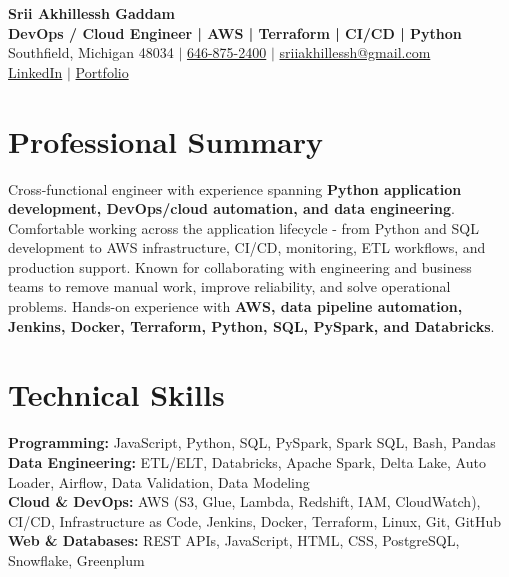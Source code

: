 \documentclass[letterpaper,10pt]{article}
\begin{document}
\fontsize{9.35pt}{10.45pt}\selectfont

\begin{center}
    {\LARGE \textbf{Srii Akhillessh Gaddam}} \\[-1pt]
    \textbf{DevOps / Cloud Engineer | AWS | Terraform | CI/CD | Python} \\[2pt]
    Southfield, Michigan 48034 $|$
    \href{tel:6468752400}{646-875-2400} $|$
    \href{mailto:sriiakhillessh@gmail.com}{sriiakhillessh@gmail.com} \\[1pt]
    \href{https://www.linkedin.com/in/srii-akhiilessh-gaddam-b48668191/}{LinkedIn} $|$
    \href{https://sriiakhillesshg.github.io/portfolio/}{Portfolio}
\end{center}
\vspace{-8pt}

\section{Professional Summary}
\small{Cross-functional engineer with experience spanning \textbf{Python application development, DevOps/cloud automation, and data engineering}. Comfortable working across the application lifecycle - from Python and SQL development to AWS infrastructure, CI/CD, monitoring, ETL workflows, and production support. Known for collaborating with engineering and business teams to remove manual work, improve reliability, and solve operational problems. Hands-on experience with \textbf{AWS, data pipeline automation, Jenkins, Docker, Terraform, Python, SQL, PySpark, and Databricks}.}

\section{Technical Skills}
\small{
\textbf{Programming:} JavaScript, Python, SQL, PySpark, Spark SQL, Bash, Pandas \\
\textbf{Data Engineering:} ETL/ELT, Databricks, Apache Spark, Delta Lake, Auto Loader, Airflow, Data Validation, Data Modeling \\
\textbf{Cloud \& DevOps:} AWS (S3, Glue, Lambda, Redshift, IAM, CloudWatch), CI/CD, Infrastructure as Code, Jenkins, Docker, Terraform, Linux, Git, GitHub \\
\textbf{Web \& Databases:} REST APIs, JavaScript, HTML, CSS, PostgreSQL, Snowflake, Greenplum
}
\end{document}
